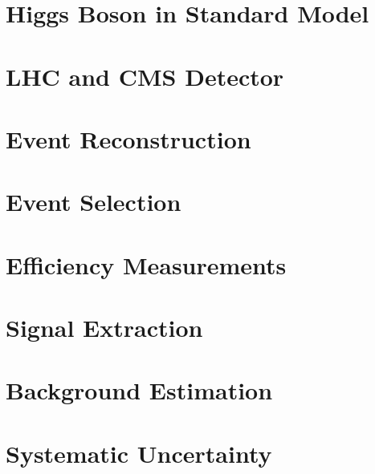 \documentclass[12pt,chapterheads]{ucsd}
\begin{document}
%






%
\chapter{Higgs Boson in Standard Model}
\label{ch:intro_higgs}


%
\chapter{LHC and CMS Detector}
\label{ch:lhc_cms}


%
\chapter{Event Reconstruction}
\label{ch:event_reconstruction}


%
\chapter{Event Selection}
\label{ch:event_selection}


%
\chapter{Efficiency Measurements}
\label{ch:efficiency_measurement}


%
\chapter{Signal Extraction}
\label{ch:signal_extraction}


%
\chapter{Background Estimation}
\label{ch:background_estimation}


%
\chapter{Systematic Uncertainty}
\label{ch:systematics}

\end{document}
